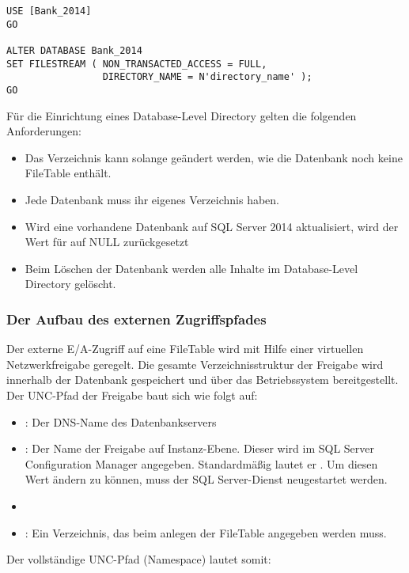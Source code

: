           \begin{lstlisting}[language=ms_sql,
          caption={Filestream-Einstellungen einer Datenbank ändern},
          label=admin04_03]
USE [Bank_2014]
GO

ALTER DATABASE Bank_2014
SET FILESTREAM ( NON_TRANSACTED_ACCESS = FULL,
                 DIRECTORY_NAME = N'directory_name' );
GO
          \end{lstlisting}
          \begin{literaturinternet}
            \item \cite{gg509097}
          \end{literaturinternet}
\clearpage
          Für die Einrichtung eines Database-Level Directory gelten die
          folgenden Anforderungen:
          \begin{itemize}
              \item Das Verzeichnis kann solange geändert werden, wie die
              Datenbank noch keine FileTable enthält.
              \item Jede Datenbank muss ihr eigenes Verzeichnis haben.
              \item Wird eine vorhandene Datenbank auf SQL Server 2014
              aktualisiert, wird der Wert für  auf
              NULL zurückgesetzt
              \item Beim Löschen der Datenbank werden alle Inhalte im
              Database-Level Directory gelöscht.
          \end{itemize}
        \subsubsection{Der Aufbau des externen Zugriffspfades}  
          Der externe E/A-Zugriff auf eine FileTable wird
          mit Hilfe einer virtuellen Netzwerkfreigabe geregelt. Die gesamte
          Verzeichnisstruktur der Freigabe wird innerhalb der Datenbank
          gespeichert und über das Betriebssystem bereitgestellt. Der UNC-Pfad der
          Freigabe baut sich wie folgt auf:
        \begin{itemize}
          \item {}: Der
          DNS-Name des Datenbankservers
          \item {}: Der Name der
          Freigabe auf Instanz-Ebene. Dieser wird im SQL Server
          Configuration Manager angegeben. Standardmäßig lautet er
          . Um diesen Wert ändern zu können, muss der
          SQL Server-Dienst neugestartet werden.
          \item {}
          \item {}: Ein Verzeichnis, das beim
          anlegen der FileTable angegeben werden muss.
        \end{itemize}
        Der vollständige UNC-Pfad (Namespace) lautet somit:
          
